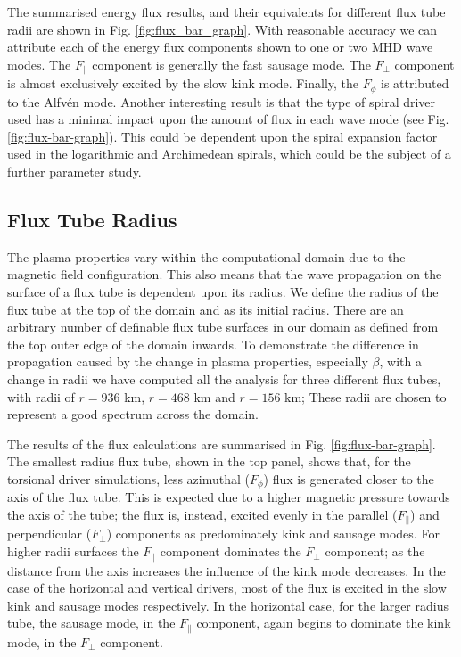 The summarised energy flux results, and their equivalents for different flux tube radii are shown in Fig. \ref{fig:flux_bar_graph}.
With reasonable accuracy we can attribute each of the energy flux components shown to one or two MHD wave modes.
The $F_\parallel$ component is generally the fast sausage mode. 
The $F_\perp$ component is almost exclusively excited by the slow kink mode.
Finally, the $F_\phi$ is attributed to the Alfv\'en mode.
Another interesting result is that the type of spiral driver used has a minimal impact upon the amount of flux in each wave mode (see Fig. \ref{fig:flux-bar-graph}).
This could be dependent upon the spiral expansion factor used in the logarithmic and Archimedean spirals, which could be the subject of a further parameter study.

\subsection{Flux Tube Radius}
The plasma properties vary within the computational domain due to the magnetic field configuration.
This also means that the wave propagation on the surface of a flux tube is dependent upon its radius. 
We define the radius of the flux tube at the top of the domain and as its initial radius.
There are an arbitrary number of definable flux tube surfaces in our domain as defined from the top outer edge of the domain inwards. 
To demonstrate the difference in propagation caused by the change in plasma properties, especially $\beta$, with a change in radii we have computed all the analysis for three different flux tubes, with radii of $r=936$ km, $r=468$ km and  $r=156$ km; These radii are chosen to represent a good spectrum across the domain.

The results of the flux calculations are summarised in Fig. \ref{fig:flux-bar-graph}.
The smallest radius flux tube, shown in the top panel, shows that, for the torsional driver simulations, less azimuthal ($F_\phi$) flux is generated closer to the axis of the flux tube. 
This is expected due to a higher magnetic pressure towards the axis of the tube; the flux is, instead, excited evenly in the parallel ($F_\parallel$) and perpendicular ($F_\perp$) components as predominately kink and sausage modes. 
For higher radii surfaces the $F_\parallel$ component dominates the $F_\perp$ component; as the distance from the axis increases the influence of the kink mode decreases.
In the case of the horizontal and vertical drivers, most of the flux is excited in the slow kink and sausage modes respectively.
In the horizontal case, for the larger radius tube, the sausage mode, in the $F_\parallel$ component, again begins to dominate the kink mode, in the $F_\perp$ component.
